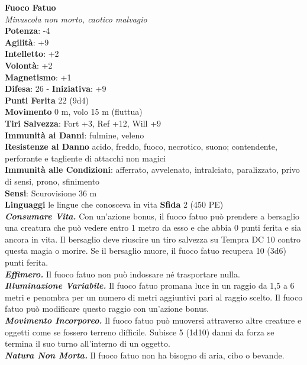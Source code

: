 \begin{multicols}{2}
\medskip\textbf{Fuoco Fatuo}\\
\emph{Minuscola non morto, caotico malvagio}\\
\textbf{Potenza}: -4\\
\textbf{Agilità}: +9\\
\textbf{Intelletto}: +2\\
\textbf{Volontà}: +2\\
\textbf{Magnetismo}: +1\\
\textbf{Difesa}: 26 - \textbf{Iniziativa}: +9\\
\textbf{Punti Ferita} 22 (9d4)\\
\textbf{Movimento} 0 m, volo 15 m (fluttua)\\
\textbf{Tiri Salvezza}: Fort +3, Ref +12, Will +9\\
\textbf{Immunità ai Danni}: fulmine, veleno\\
\textbf{Resistenze al Danno} acido, freddo, fuoco, necrotico, suono; contendente, perforante e tagliente di attacchi non magici\\
\textbf{Immunità alle Condizioni}: afferrato, avvelenato, intralciato, paralizzato, privo di sensi, prono, sfinimento\\
\textbf{Sensi}: Scurovisione 36 m\\
\textbf{Linguaggi} le lingue che conosceva in vita
\textbf{Sfida} 2 (450 PE)\smallskip\\
\emph{\textbf{Consumare Vita.}} Con un'azione bonus, il fuoco fatuo può prendere a bersaglio una creatura che può vedere entro 1 metro da esso e che abbia 0 punti ferita e sia ancora in vita. Il bersaglio deve riuscire un tiro salvezza su Tempra DC 10 contro questa magia o morire. Se il bersaglio muore, il fuoco fatuo recupera 10 (3d6) punti ferita.\\
\emph{\textbf{Effimero.}} Il fuoco fatuo non può indossare né trasportare nulla.\\
\emph{\textbf{Illuminazione Variabile.}} Il fuoco fatuo promana luce in un raggio da 1,5 a 6 metri e penombra per un numero di metri aggiuntivi pari al raggio scelto. Il fuoco fatuo può modificare questo raggio con un'azione bonus.\\
\emph{\textbf{Movimento Incorporeo.}} Il fuoco fatuo può muoversi attraverso altre creature e oggetti come se fossero terreno difficile. Subisce 5 (1d10) danni da forza se termina il suo turno all'interno di un oggetto.\\
\emph{\textbf{Natura Non Morta.}} Il fuoco fatuo non ha bisogno di aria, cibo o bevande.\\

\end{multicols}
